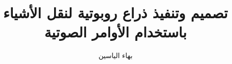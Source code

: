 \documentclass[12pt,a4paper,fleqn]{report}
\begin{document}

\title{ تصميم وتنفيذ ذراع روبوتية لنقل الأشياء باستخدام الأوامر الصوتية}
\author{بهاء الياسين}

\maketitle

 \clearpage  %
 \clearpage %

\tableofcontents
\clearpage


 \clearpage %
 \clearpage    
 \clearpage  
 \clearpage 
 \clearpage


\end{document}
